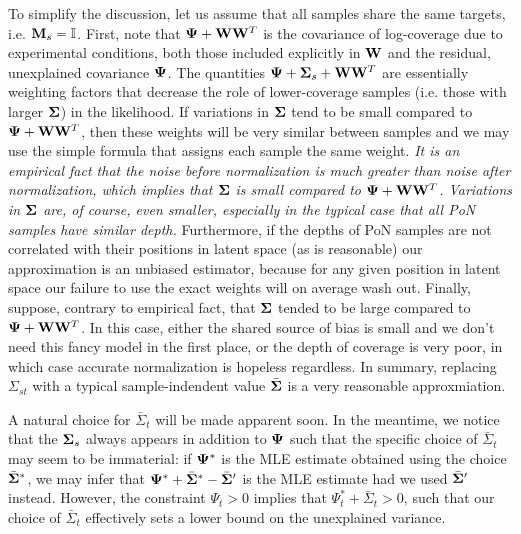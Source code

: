 \documentclass[nofootinbib,amssymb,amsmath]{revtex4}
\newcommand{\vM}{{\bf M}}
\newcommand{\vW}{{\bf W}}
\newcommand{\vPsi}{{\bf \Psi}}
\newcommand{\vSigma}{{\bf \Sigma}}
\begin{document}
%
To simplify the discussion, let us assume that all samples share the same targets, i.e. $\vM_s = \mathbb{I}$.
First, note that $\vPsi + \vW \vW^T$ is the covariance of log-coverage due to experimental conditions, both those included explicitly in $\vW$ and the residual, unexplained covariance $\vPsi$. The quantities $\vPsi + \vSigma_s + \vW \vW^T$ are essentially weighting factors that decrease the role of lower-coverage samples (i.e. those with larger $\vSigma$) in the likelihood. If variations in $\vSigma$ tend to be small compared to $\vPsi + \vW \vW^T$, then these weights will be very similar between samples and we may use the simple formula that assigns each sample the same weight. {\em It is an empirical fact that the noise before normalization is much greater than noise after normalization, which implies that $\vSigma$ is small compared to $\vPsi + \vW \vW^T$. Variations in $\vSigma$ are, of course, even smaller, especially in the typical case that all PoN samples have similar depth.} Furthermore, if the depths of PoN samples are not correlated with their positions in latent space (as is reasonable) our approximation is an unbiased estimator, because for any given position in latent space our failure to use the exact weights will on average wash out.  Finally, suppose, contrary to empirical fact, that $\vSigma$ tended to be large compared to $\vPsi + \vW \vW^T$. In this case, either the shared source of bias is small and we don't need this fancy model in the first place, or the depth of coverage is very poor, in which case accurate normalization is hopeless regardless. In summary, replacing $\Sigma_{st}$ with a typical sample-indendent value $\bar{\vSigma}$ is a very reasonable approxmiation.

A natural choice for $\bar{\Sigma}_t$ will be made apparent soon. In the meantime, we notice that the $\vSigma_s$ always appears in addition to $\vPsi$ such that the specific choice of $\bar{\Sigma}_t$ may seem to be immaterial: if $\vPsi^*$ is the MLE estimate obtained using the choice $\bar{\vSigma}^*$, we may infer that $\vPsi^* + \bar{\vSigma}^* - \bar{\vSigma}'$ is the MLE estimate had we used $\bar{\vSigma}'$ instead. However, the constraint $\Psi_t > 0$ implies that $\Psi^*_t + \bar{\Sigma}_t > 0$, such that our choice of $\bar{\Sigma}_t$ effectively sets a lower bound on the unexplained variance.\\
\end{document}
